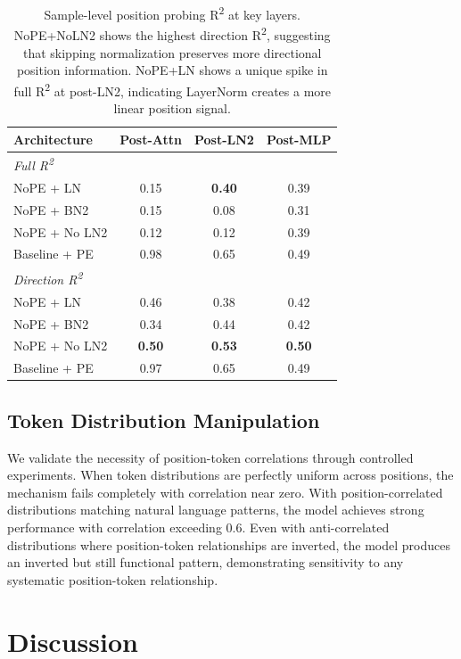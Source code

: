 \documentclass[11pt]{article}
\begin{document}
\begin{table}[htbp]
\centering
\small
\begin{tabular}{lccc}
\toprule
\textbf{Architecture} & \textbf{Post-Attn} & \textbf{Post-LN2} & \textbf{Post-MLP} \\
\midrule
\multicolumn{4}{l}{\textit{Full R\textsuperscript{2}}} \\
NoPE + LN & 0.15 & \textbf{0.40} & 0.39 \\
NoPE + BN2 & 0.15 & 0.08 & 0.31 \\
NoPE + No LN2 & 0.12 & 0.12 & 0.39 \\
Baseline + PE & 0.98 & 0.65 & 0.49 \\
\midrule
\multicolumn{4}{l}{\textit{Direction R\textsuperscript{2}}} \\
NoPE + LN & 0.46 & 0.38 & 0.42 \\
NoPE + BN2 & 0.34 & 0.44 & 0.42 \\
NoPE + No LN2 & \textbf{0.50} & \textbf{0.53} & \textbf{0.50} \\
Baseline + PE & 0.97 & 0.65 & 0.49 \\
\bottomrule
\end{tabular}
\caption{Sample-level position probing R\textsuperscript{2} at key layers. NoPE+NoLN2 shows the highest direction R\textsuperscript{2}, suggesting that skipping normalization preserves more directional position information. NoPE+LN shows a unique spike in full R\textsuperscript{2} at post-LN2, indicating LayerNorm creates a more linear position signal.}
\label{tab:sample-level-summary}
\end{table}

\subsection{Token Distribution Manipulation}

We validate the necessity of position-token correlations through controlled experiments. When token distributions are perfectly uniform across positions, the mechanism fails completely with correlation near zero. With position-correlated distributions matching natural language patterns, the model achieves strong performance with correlation exceeding 0.6. Even with anti-correlated distributions where position-token relationships are inverted, the model produces an inverted but still functional pattern, demonstrating sensitivity to any systematic position-token relationship.

\section{Discussion}
\end{document}
